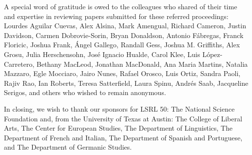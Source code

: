 \documentclass[output=paper,draftmode]{langscibook}
\begin{document}
A special word of gratitude is owed to the colleagues who shared of their time and expertise in reviewing papers submitted for these referred proceedings: Lourdes Aguilar Cuevas, Alex Alsina, Mark Amengual, Richard Cameron, Justin Davidson, Carmen Dobrovie-Sorin, Bryan Donaldson, Antonio Fábregas, Franck Floricic, Joshua Frank, Ángel Gallego, Randall Gess, Joshua M. Griffiths, Alex Grosu, Julia Herschensohn, José Ignacio Hualde, Carol Klee, Luis López-Carretero, Bethany MacLeod, Jonathan MacDonald, Ana Maria Martins, Natalia Mazzaro, Egle Mocciaro, Jairo Nunes, Rafael Orosco, Luis Ortiz, Sandra Paoli, Rajiv Rao, Ian Roberts, Teresa Satterfield, Laura Spinu, Andrés Saab, Jacqueline Serigos, and others who wished to remain anonymous.

In closing, we wish to thank our sponsors for LSRL 50: The National Science Foundation and, from the University of Texas at Austin:  The College of Liberal Arts, The Center for European Studies, The Department of Linguistics, The Department of French and Italian, The Department of Spanish and Portuguese, and The Department of Germanic Studies.

{\sloppy\printbibliography[heading=subbibliography,notkeyword=this]}
\end{document}
